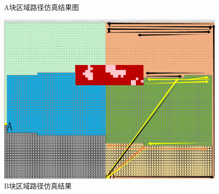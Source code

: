 \documentclass{whutmod}
\begin{document}
	\addtocounter{figure}{-1}       %
	\begin{figure} [H]
		\addtocounter{figure}{1}      %
		\centering 

		\quad
		\quad
		\caption{A块区域路径仿真结果图}\label{imgxxxx}
	\end{figure}


	\begin{figure}[H]
		\centering
		\includegraphics[width=.7\textwidth]{figures/77.png}
		\caption{B块区域路径仿真结果}\label{imgxxxxx}
	\end{figure}
	
\end{document}
